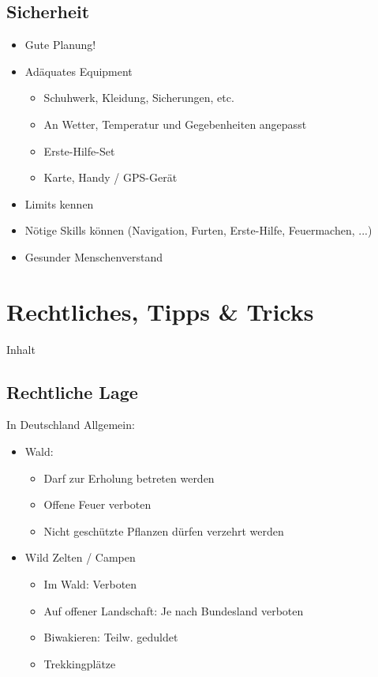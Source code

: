\documentclass[aspectratio=169]{beamer}
\begin{document}
		\subsection{Sicherheit}
			
			\begin{frame}{}
				\begin{itemize}
					\item Gute Planung!
					\item Adäquates Equipment
					\begin{itemize}
						\item Schuhwerk, Kleidung, Sicherungen, etc.
						\item An Wetter, Temperatur und Gegebenheiten angepasst
						\item Erste-Hilfe-Set
						\item Karte, Handy / GPS-Gerät
					\end{itemize}
					\item Limits kennen
					\item Nötige Skills können (Navigation, Furten, Erste-Hilfe, Feuermachen, ...)\pause
					\item Gesunder Menschenverstand
				\end{itemize}
			\end{frame}
	
	\section{Rechtliches, Tipps \& Tricks}
		
		\begin{frame}[t]{Inhalt}
		\end{frame}
	
		\subsection{Rechtliche Lage}
			
			\begin{frame}{In Deutschland}
				Allgemein:
				\begin{itemize}
					\item Wald:
					\begin{itemize}
						\item Darf zur Erholung betreten werden
						\item Offene Feuer verboten
						\item Nicht geschützte Pflanzen dürfen verzehrt werden
					\end{itemize}
					\item Wild Zelten / Campen
					\begin{itemize}
						\item Im Wald: Verboten
						\item Auf offener Landschaft: Je nach Bundesland verboten
						\item Biwakieren: Teilw. geduldet
						\item[\textrightarrow] Trekkingplätze
					\end{itemize}
				\end{itemize}
			\end{frame}
			
\end{document}
